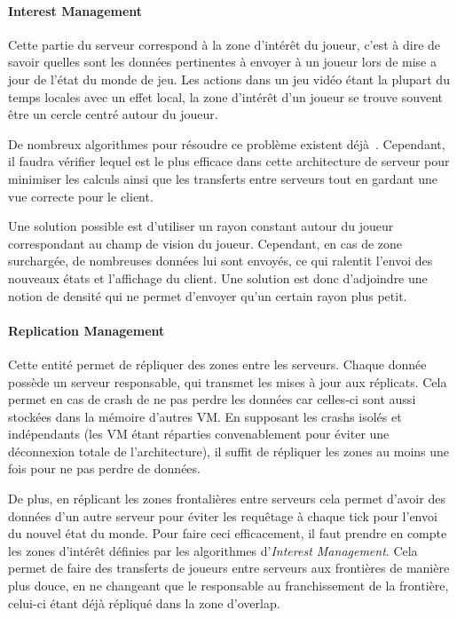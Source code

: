\paragraph{Interest Management\\}
Cette partie du serveur correspond à la zone d'intérêt du joueur, c'est à dire de savoir quelles sont les données pertinentes à envoyer à un joueur lors de mise a jour de l'état du monde de jeu.
Les actions dans un jeu vidéo étant la plupart du temps locales avec un effet local, la zone d'intérêt d'un joueur se trouve souvent être un cercle centré autour du joueur.

De nombreux algorithmes pour résoudre ce problème existent déjà~\cite{interest_management_algorithm}.
Cependant, il faudra vérifier lequel est le plus efficace dans cette architecture de serveur pour minimiser les calculs ainsi que les transferts entre serveurs tout en gardant une vue correcte pour le client.

Une solution possible est d'utiliser un rayon constant autour du joueur correspondant au champ de vision du joueur.
Cependant, en cas de zone surchargée, de nombreuses données lui sont envoyés, ce qui ralentit l'envoi des nouveaux états et l'affichage du client.
Une solution est donc d'adjoindre une notion de densité qui ne permet d'envoyer qu'un certain rayon plus petit.

\paragraph{Replication Management\\}
Cette entité permet de répliquer des zones entre les serveurs.
Chaque donnée possède un serveur responsable, qui transmet les mises à jour aux réplicats.
Cela permet en cas de crash de ne pas perdre les données car celles-ci sont aussi stockées dans la mémoire d'autres VM.
En supposant les crashs isolés et indépendants (les VM étant réparties convenablement pour éviter une déconnexion totale de l'architecture), il suffit de répliquer les zones au moins une fois pour ne pas perdre de données.

De plus, en réplicant les zones frontalières entre serveurs cela permet d'avoir des données d'un autre serveur pour éviter les requêtage à chaque tick pour l'envoi du nouvel état du monde.
Pour faire ceci efficacement, il faut prendre en compte les zones d'intérêt définies par les algorithmes d'\textit{Interest Management}.
Cela permet de faire des transferts de joueurs entre serveurs aux frontières de manière plus douce, en ne changeant que le responsable au franchissement de la frontière, celui-ci étant déjà répliqué dans la zone d'overlap.


